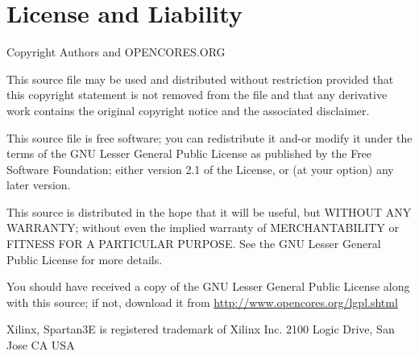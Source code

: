\documentclass{gajewski}
\begin{document}
\newpage

\section{License and Liability}
Copyright\textcopyright {} Authors and OPENCORES.ORG

This source file may be used and distributed without
restriction provided that this copyright statement is not
removed from the file and that any derivative work contains
the original copyright notice and the associated disclaimer.

This source file is free software; you can redistribute it
and-or modify it under the terms of the GNU Lesser General
Public License as published by the Free Software Foundation;
either version 2.1 of the License, or (at your option) any
later version.

This source is distributed in the hope that it will be
useful, but WITHOUT ANY WARRANTY; without even the implied
warranty of MERCHANTABILITY or FITNESS FOR A PARTICULAR
PURPOSE. See the GNU Lesser General Public License for more
details.

You should have received a copy of the GNU Lesser General
Public License along with this source; if not, download it
from \href{http://www.opencores.org/lgpl.shtml}{http://www.opencores.org/lgpl.shtml}

Xilinx, Spartan3E is registered trademark of Xilinx Inc. 2100 Logic Drive, San Jose CA USA

\newpage


\end{document}

